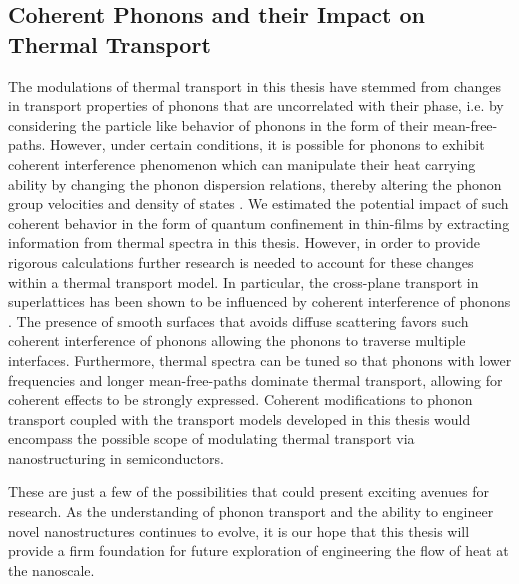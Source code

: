 \subsection{Coherent Phonons and their Impact on Thermal Transport}
The modulations of thermal transport in this thesis have stemmed from changes in transport properties of phonons that are uncorrelated with their phase, i.e. by considering the particle like behavior of phonons in the form of their mean-free-paths. However, under certain conditions, it is possible for phonons to exhibit coherent interference phenomenon which can manipulate their heat carrying ability by changing the phonon dispersion relations, thereby altering the phonon group velocities and density of states \cite{RN132,RN362}. We estimated the potential impact of such coherent behavior in the form of quantum confinement in thin-films by extracting information from thermal spectra in this thesis. However, in order to provide rigorous calculations further research is needed to account for these changes within a thermal transport model. In particular, the cross-plane transport in superlattices has been shown to be influenced by coherent interference of phonons \cite{RN393}. The presence of smooth surfaces that avoids diffuse scattering favors such coherent interference of phonons \cite{RN132,RN362} allowing the phonons to traverse multiple interfaces. Furthermore, thermal spectra can be tuned so that phonons with lower frequencies and longer mean-free-paths dominate thermal transport, allowing for coherent effects to be strongly expressed. Coherent modifications to phonon transport coupled with the transport models developed in this thesis would encompass the possible scope of modulating thermal transport via nanostructuring in semiconductors.
\par These are just a few of the possibilities that could present exciting avenues for research. As the understanding of phonon transport and the ability to engineer novel nanostructures continues to evolve, it is our hope that this thesis will provide a firm foundation for future exploration of engineering the flow of heat at the nanoscale.

